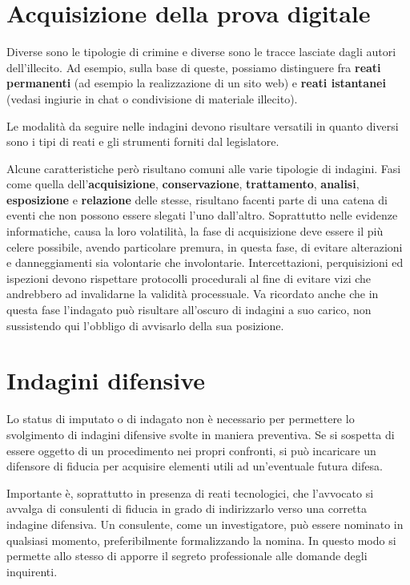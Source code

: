 \section{Acquisizione della prova digitale}

Diverse sono le tipologie di crimine e diverse sono le tracce lasciate dagli autori dell'illecito. Ad esempio, sulla base di queste, possiamo distinguere fra \textbf{reati permanenti} (ad esempio la realizzazione di un sito web) e \textbf{reati istantanei} (vedasi ingiurie in chat o condivisione di materiale illecito).

Le modalità da seguire nelle indagini devono risultare versatili in quanto diversi sono i tipi di reati e gli strumenti forniti dal legislatore.

Alcune caratteristiche però risultano comuni alle varie tipologie di indagini. Fasi come quella dell'\textbf{acquisizione}, \textbf{conservazione}, \textbf{trattamento}, \textbf{analisi}, \textbf{esposizione} e \textbf{relazione} delle stesse, risultano facenti parte di una catena di eventi che non possono essere slegati l'uno dall'altro. Soprattutto nelle evidenze informatiche, causa la loro volatilità, la fase di acquisizione deve essere il più celere possibile, avendo particolare premura, in questa fase, di evitare alterazioni e danneggiamenti sia volontarie che involontarie. Intercettazioni, perquisizioni ed ispezioni devono rispettare protocolli procedurali al fine di evitare vizi che andrebbero ad invalidarne la validità processuale. Va ricordato anche che in questa fase l'indagato può risultare all'oscuro di indagini a suo carico, non sussistendo qui l'obbligo di avvisarlo della sua posizione.

\section{Indagini difensive}

Lo status di imputato o di indagato non è necessario per permettere lo svolgimento di indagini difensive svolte in maniera preventiva. Se si sospetta di essere oggetto di un procedimento nei propri confronti, si può incaricare un difensore di fiducia per acquisire elementi utili ad un'eventuale futura difesa.

Importante è, soprattutto in presenza di reati tecnologici, che l'avvocato si avvalga di consulenti di fiducia in grado di indirizzarlo verso una corretta indagine difensiva. Un consulente, come un investigatore, può essere nominato in qualsiasi momento, preferibilmente formalizzando la nomina. In questo modo si permette allo stesso di apporre il segreto professionale alle domande degli inquirenti.

